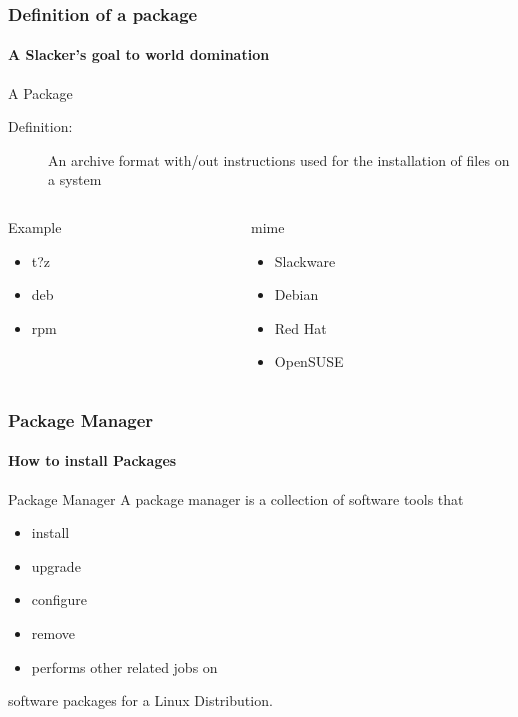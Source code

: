 \documentclass[1pt,hyperref={pdfpagelabels=true}]{beamer}
\begin{document}
\begin{frame}
  \frametitle{Definition of a package}
  \framesubtitle{A Slacker's goal to world domination}
  
  \begin{block}{A Package}
    \begin{description}
    \item[Definition:] An archive format with/out instructions used for the
      installation of files on a system
    \end{description}
  \end{block}
  
  \pause
  
  \begin{columns}
    \begin{column}{4cm}
      \begin{block}{Example}
        \begin{itemize}[<+-| alert@+>]
        \item<2-> t?z
        \item<3-> deb
        \item<4-> rpm
        \end{itemize}
      \end{block}
    \end{column}
    
    \begin{column}{4cm}
      \begin{block}{mime}
        \begin{itemize}[<+-| alert@+>]
        \item<2-> Slackware
        \item<3-> Debian
        \item<4-> Red Hat
        \item<4-> OpenSUSE
        \end{itemize}
      \end{block}
    \end{column}
  \end{columns}
  
\end{frame}

\begin{frame}
  \frametitle{Package Manager}
  \framesubtitle{How to install Packages}
  
  \begin{block}{Package Manager}
    A package manager is a collection of software tools that
    \begin{itemize}[<+-| alert@+>]
    \item<2,7> install
    \item<3,7> upgrade
    \item<4,7> configure
    \item<5,7> remove
    \item<6,7> performs other related jobs on
    \end{itemize}
    
    \pause
    
    software packages for a Linux Distribution.
  \end{block}
  
\end{frame}
\end{document}
